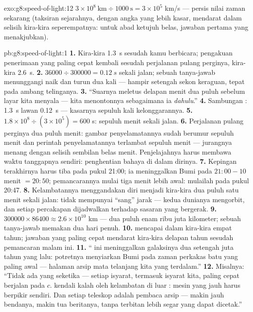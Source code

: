 \begin{solution}{exo:g8:speed-of-light:12}
$3 \times 10^{8}\ \text{km} \div 1000\ \text{s} = 3 \times
10^{5}$ \unit{km/s} --- persis nilai zaman sekarang (taksiran
sejarahnya, dengan angka  yang lebih kasar, mendarat dalam
selisih kira-kira seperempatnya: untuk abad ketujuh belas, jawaban
pertama yang menakjubkan).
\end{solution}

\begin{solution}{pb:g8:speed-of-light:1}
\textbf{1.} Kira-kira \qty{1.3}{s} sesudah kamu berbicara; pengakuan
penerimaan yang paling cepat kembali sesudah perjalanan pulang
perginya, kira-kira \qty{2.6}{s}.
\textbf{2.} $36000 \div 300000 = \qty{0.12}{s}$ sekali jalan; sebuah
tanya-jawab menunggangi naik dan turun dua kali --- hampir setengah
sekon keraguan, tepat pada ambang telinganya.
\textbf{3.} ``Suarnya meletus delapan menit dua puluh sebelum layar
kita menyala --- kita menontonnya sebagaimana ia \emph{dahulu}.''
\textbf{4.} Sambungan : \qty{1.3}{s} lawan \qty{0.12}{s}
--- kasarnya sepuluh kali kelonggarannya.
\textbf{5.} $1.8 \times 10^{8} \div (3 \times 10^{5}) = 600$
s: sepuluh menit sekali jalan.
\textbf{6.} Perjalanan pulang perginya dua puluh menit: gambar
penyelamatannya sudah berumur sepuluh menit dan perintah
penyelamatannya terlambat sepuluh menit --- jurangnya menang dengan
selisih sembilan belas menit. Penjelajahnya harus membawa waktu
tanggapnya sendiri: penghentian bahaya di dalam dirinya.
\textbf{7.} Kepingan terakhirnya harus tiba pada pukul 21:00; ia
meninggalkan Bumi pada $21{:}00 - 10$ menit $= 20{:}50$; pemancarannya
mulai tiga menit lebih awal: mulailah pada pukul 20:47.
\textbf{8.} Kelambatannya menggandakan diri menjadi kira-kira dua
puluh satu menit sekali jalan:  tidak mempunyai ``sang'' jarak
--- kedua dunianya mengorbit, dan setiap percakapan dijadwalkan
terhadap sasaran yang bergerak.
\textbf{9.} $300000 \times 86400 \approx 2.6 \times 10^{10}$
km --- dua puluh enam ribu juta kilometer; sebuah tanya-jawab memakan
dua hari penuh.
\textbf{10.}  mencapai  dalam kira-kira empat tahun;
jawaban yang paling cepat mendarat kira-kira delapan tahun sesudah
pemancaran malam ini.
\textbf{11.} `` ini meninggalkan galaksinya dua setengah juta
tahun yang lalu: potretnya menyiarkan Bumi pada zaman perkakas batu
yang paling awal --- halaman arsip mata telanjang kita yang
terdalam.''
\textbf{12.} Misalnya: ``Tidak ada yang seketika --- setiap isyarat,
termasuk isyarat kita, paling cepat berjalan pada $c$.  kendali
kalah oleh kelambatan di luar : mesin yang jauh harus berpikir
sendiri. Dan setiap teleskop adalah pembaca arsip --- makin jauh
bendanya, makin tua beritanya, tanpa terbitan lebih segar yang dapat
dicetak.''
\end{solution}
